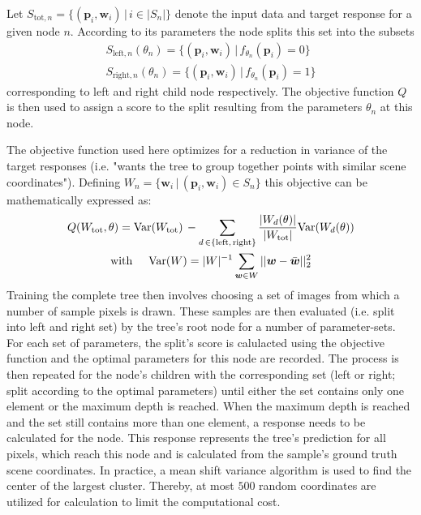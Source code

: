 \documentclass[final]{cvpr}
\begin{document}
Let $S_{\text{tot},n} = \{ (\boldsymbol{p}_i, \boldsymbol{w}_i) \, | \, i \in |S_n|\}$ denote the
input data and target response for a given node $n$. According to its parameters the
node splits this set into the subsets
\begin{equation}
\begin{split}
	S_{\text{left},n}(\theta_n) = \{(\boldsymbol{p}_i, \boldsymbol{w}_i) \,|\, f_{\theta_n}(\boldsymbol{p}_i) = 0\} \\
	S_{\text{right},n}(\theta_n) = \{(\boldsymbol{p}_i, \boldsymbol{w}_i) \,|\, f_{\theta_n}(\boldsymbol{p}_i) = 1\}
\end{split}
\end{equation}
corresponding to left and right child node respectively. The objective function $Q$ is
then used to assign a score to the split resulting from the parameters $\theta_n$ at
this node.

The objective function used here optimizes for a reduction in variance of the target 
responses (i.e. "wants the tree to group together points with similar scene coordinates").
Defining $W_n = \{ \boldsymbol{w}_i \, | \, (\boldsymbol{p}_i, \boldsymbol{w}_i) \in S_n \}$ this
objective can be mathematically expressed as:
\begin{multline}
	Q(W_\text{tot}, \theta) =
		\text{Var}(W_\text{tot})\, - \sum_{d\,\in\{\text{left,\,right}\}}
			\dfrac{|W_d(\theta)|}{|W_\text{tot}|} \text{Var}(W_d(\theta))\\
	\text{with} \hspace{5mm} \text{Var}(W) = |W|^{-1} \sum_{\boldsymbol{w}\in W} ||\boldsymbol{w} - \bar{\boldsymbol{w}}||_2^2
\end{multline}
Training the complete tree then involves choosing a set of images from which a number
of sample pixels is drawn. These samples are then evaluated (i.e. split into left and right set)
by the tree's root node for a number of parameter-sets. For each set of parameters, the
split's score is calulacted using the objective function and the optimal parameters for
this node are recorded. The process is then repeated for the node's children with the corresponding
set (left or right; split according to the optimal parameters) until either the set contains
only one element or the maximum depth is reached.
When the maximum depth is reached and the set still contains more than one element, a response
needs to be calculated for the node. This response represents the tree's prediction for 
all pixels, which reach this node and is calculated from the sample's ground truth scene coordinates.
In practice, a mean shift variance algorithm \cite{Comaniciu2002} is used to find the center of the 
largest cluster. Thereby, at most $500$ random coordinates are utilized for calculation to limit 
the computational cost.
\end{document}
